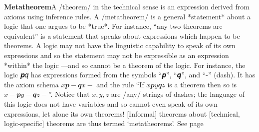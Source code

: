 \documentclass[11pt]{article}
\begin{document}
\vspace{1em}\textbf{Metatheorem}\quad\label{org-special-block-extras-glossary-Metatheorem}A /theorem/ in the technical sense is an expression derived from axioms using inference rules.  A /metatheorem/ is a general *statement* about a logic that one argues to be *true*.  For instance, “any two theorems are equivalent” is a statement that speaks about expressions which happen to be theorems. A logic may not have the linguistic capability to speak of its own expressions and so the statement may not be expressible as an expression *within* the logic ---and so cannot be a theorem of the logic.  For instance, the logic 𝒑𝑞 has expressions formed from the symbols “𝒑”, “𝒒”, and “-” (dash). It has the axiom schema $x𝒑-𝒒x-$ and the rule “If $x𝒑y𝒒z$ is a theorem then so is $x-𝒑y-𝒒z-$”. Notice that $x, y, z$ are /any/ strings of dashes; the language of this logic does not have variables and so cannot even speak of its own expressions, let alone its own theorems!  [Informal] theorems about [technical, logic-specific] theorems are thus termed ‘metatheorems’. See page \pageref{org-special-block-extras-glossary-declaration-site-Metatheorem}
\end{document}
